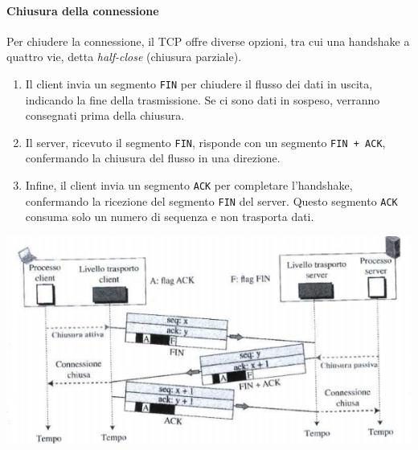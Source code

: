 \documentclass[12pt]{report}
\begin{document}
	\paragraph{Chiusura della connessione}
	Per chiudere la connessione, il TCP offre diverse opzioni, tra cui una handshake a quattro vie, detta \textit{half-close} (chiusura parziale).
	\begin{enumerate}
		\item Il client invia un segmento \texttt{FIN} per chiudere il flusso dei dati in uscita, indicando la fine della trasmissione. Se ci sono dati in sospeso, verranno consegnati prima della chiusura.
		\item Il server, ricevuto il segmento \texttt{FIN}, risponde con un segmento \texttt{FIN + ACK}, confermando la chiusura del flusso in una direzione.
		\item Infine, il client invia un segmento \texttt{ACK} per completare l'handshake, confermando la ricezione del segmento \texttt{FIN} del server. Questo segmento \texttt{ACK} consuma solo un numero di sequenza e non trasporta dati.
	\end{enumerate}
	\begin{center}
		\includegraphics[scale=0.6]{assets/closingconn.png}
	\end{center}
\end{document}
